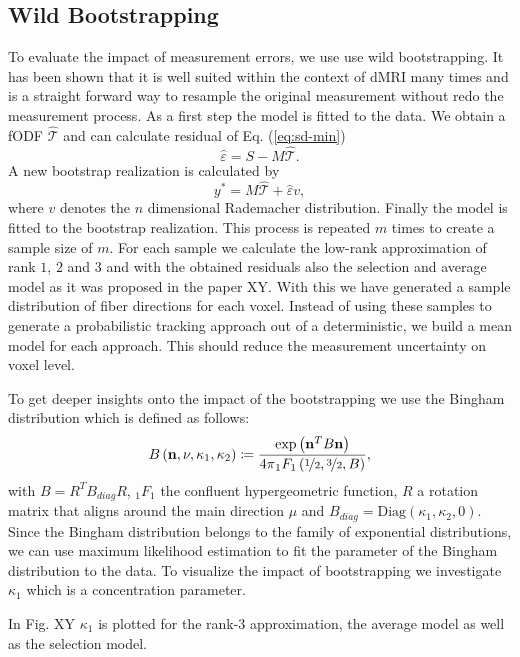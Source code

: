 \subsection{Wild Bootstrapping}
To evaluate the impact of measurement errors, we use use wild bootstrapping. It
has been shown that it is well suited within the context of dMRI many times and
is a straight forward way to
resample the original measurement without redo the measurement process.
As a first step the model is fitted to the data. We obtain a fODF
$\hat{\mathcal{T}}$ and can calculate residual of Eq. (\ref{eq:sd-min}) 
\[ \hat{\varepsilon} = S - M\hat{\mathcal{T}} .\] 
A new bootstrap realization is calculated by 
\[ y^{*} = M\hat{\mathcal{T}}  + \hat{\varepsilon} v , \]
where $v$ denotes the $n$ dimensional Rademacher distribution. Finally the
model is fitted to the bootstrap realization. This process is repeated $m$
times to create a sample size of $m$.
For each sample we calculate the low-rank approximation of rank $1$, $2$ and $3$
and with the obtained residuals also the selection and average model as it was
proposed in the paper XY. With this we have generated a sample distribution of
fiber directions for each voxel. Instead of using these samples to generate a
probabilistic tracking approach out of a deterministic, we build a mean model
for each approach. This should reduce the measurement uncertainty on voxel
level. 

To get deeper insights onto the impact of the bootstrapping we use the  Bingham 
distribution which is defined as follows: 
\[
	B \left( \mathbf{n}, \nu, \kappa_1, \kappa_2 \right) \coloneqq
	\frac{\exp \left( \mathbf{n}^T B \mathbf{n} \right)}{4 \pi {}_1F_1
	\left( \nicefrac{1}{2} , \nicefrac{3}{2} , B \right)} ,  
\]
with $B = R^T B_{diag} R$, ${}_1 F_1$ the confluent hypergeometric function, $R$
a rotation matrix that aligns around the main direction $\mu$ and $B_{diag} =
\text{Diag} \left( \kappa_1, \kappa_2 , 0 \right)$. 
Since the Bingham distribution belongs to the family of exponential
distributions, we can use maximum likelihood estimation to fit the parameter of
the Bingham distribution to the data. To visualize the impact of bootstrapping
we investigate $\kappa_1$ which is a concentration parameter.

In Fig. XY
$\kappa_1$ is plotted for the rank-$3$ approximation, the average model as well
as the selection model.



